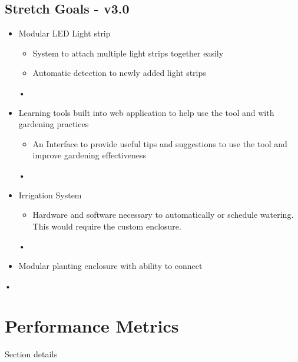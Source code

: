\documentclass[letterpaper,10pt,draftclsnofoot,onecolumn]{article}
\begin{document}
	\subsection*{Stretch Goals - v3.0}
		\begin{itemize}
			\item Modular LED Light strip
				\begin{itemize}
					\item System to attach multiple light strips together easily
					\item Automatic detection to newly added light strips
				\end{itemize}•
			\item Learning tools built into web application to help use the tool and with gardening practices
				\begin{itemize}
					\item An Interface to provide useful tips and suggestions to use the tool and improve gardening effectiveness
				\end{itemize}•
			\item Irrigation System
				\begin{itemize}
					\item Hardware and software necessary to automatically or schedule watering. This would require the custom enclosure. 
				\end{itemize}•
			\item Modular planting enclosure with ability to connect 
		\end{itemize}•


	\section*{Performance Metrics}
	Section details
\end{document}
